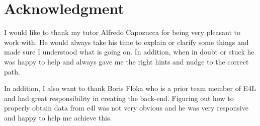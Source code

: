\section*{Acknowledgment}

I would like to thank my tutor Alfredo Capozucca for being very
pleasant to work with. He would always take his time to explain or
clarify some things and made sure I understood what is going on. In
addition, when in doubt or stuck he was happy to help and always gave
me the right hints and nudge to the correct path.

In addition, I also want to thank Boris Floka who is a prior team
member of E4L and had great responsibility in creating the back-end.
Figuring out how to properly obtain data from \gls{e4l} was not very
obvious and he was very responsive and happy to help me achieve this.

